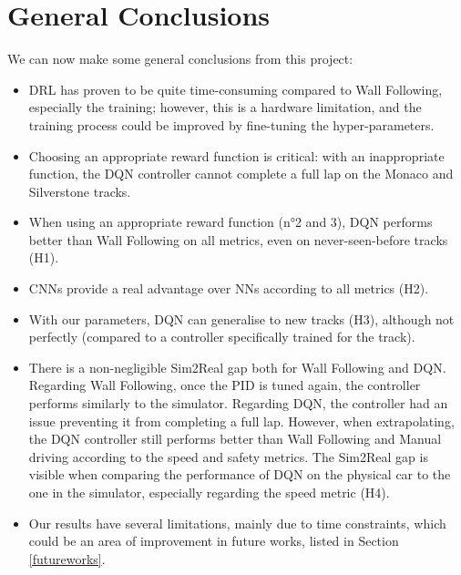 \section{General Conclusions}
\label{generalconclusions}

We can now make some general conclusions from this project: 
\begin{itemize}
	\item DRL has proven to be quite time-consuming compared to Wall Following, especially the training; however, this is a hardware limitation, and the training process could be improved by fine-tuning the hyper-parameters.
	\item Choosing an appropriate reward function is critical: with an inappropriate function, the DQN controller cannot complete a full lap on the Monaco and Silverstone tracks.
	\item When using an appropriate reward function (n°2 and 3), DQN performs better than Wall Following on all metrics, even on never-seen-before tracks (H1).
	\item CNNs provide a real advantage over NNs according to all metrics (H2).
	\item With our parameters, DQN can generalise to new tracks (H3), although not perfectly (compared to a controller specifically trained for the track). 
	\item There is a non-negligible Sim2Real gap both for Wall Following and DQN. Regarding Wall Following, once the PID is tuned again, the controller performs similarly to the simulator. Regarding DQN, the controller had an issue preventing it from completing a full lap. However, when extrapolating, the DQN controller still performs better than Wall Following and Manual driving according to the speed and safety metrics. The Sim2Real gap is visible when comparing the performance of DQN on the physical car to the one in the simulator, especially regarding the speed metric (H4).
	\item Our results have several limitations, mainly due to time constraints, which could be an area of improvement in future works, listed in Section \ref{futureworks}.
\end{itemize}


